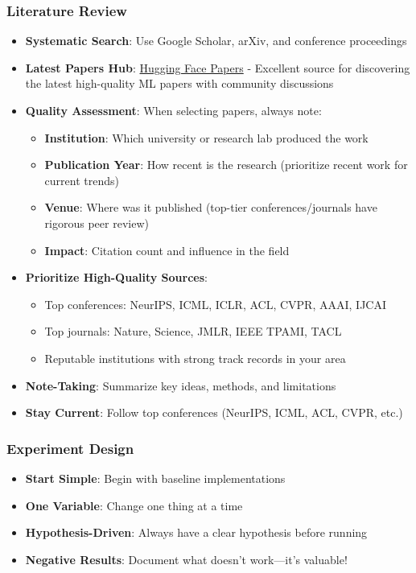 \documentclass[11pt,a4paper]{article}
\begin{document}
\subsubsection{Literature Review}
\begin{itemize}
    \item \textbf{Systematic Search}: Use Google Scholar, arXiv, and conference proceedings
    \item \textbf{Latest Papers Hub}: \href{https://huggingface.co/papers}{Hugging Face Papers} - Excellent source for discovering the latest high-quality ML papers with community discussions
    \item \textbf{Quality Assessment}: When selecting papers, always note:
    \begin{itemize}
        \item \textbf{Institution}: Which university or research lab produced the work
        \item \textbf{Publication Year}: How recent is the research (prioritize recent work for current trends)
        \item \textbf{Venue}: Where was it published (top-tier conferences/journals have rigorous peer review)
        \item \textbf{Impact}: Citation count and influence in the field
    \end{itemize}
    \item \textbf{Prioritize High-Quality Sources}:
    \begin{itemize}
        \item Top conferences: NeurIPS, ICML, ICLR, ACL, CVPR, AAAI, IJCAI
        \item Top journals: Nature, Science, JMLR, IEEE TPAMI, TACL
        \item Reputable institutions with strong track records in your area
    \end{itemize}
    \item \textbf{Note-Taking}: Summarize key ideas, methods, and limitations
    \item \textbf{Stay Current}: Follow top conferences (NeurIPS, ICML, ACL, CVPR, etc.)
\end{itemize}

\subsubsection{Experiment Design}
\begin{itemize}
    \item \textbf{Start Simple}: Begin with baseline implementations
    \item \textbf{One Variable}: Change one thing at a time
    \item \textbf{Hypothesis-Driven}: Always have a clear hypothesis before running
    \item \textbf{Negative Results}: Document what doesn't work—it's valuable!
\end{itemize}
\end{document}
